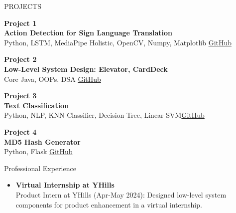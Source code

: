 \documentclass{resume} %
\begin{document}
\begin{rSection}{PROJECTS}
\vspace{-1.25em}
\item \textbf{Project 1} \\
\textbf{Action Detection for Sign Language Translation}\\
{Python, LSTM, MediaPipe Holistic, OpenCV, Numpy, Matplotlib} \hfill 
\href{https://github.com/yadavankit671/Action-Detection-For-Sign-Language-Translation}{GitHub}
\item \textbf{Project 2} \\
\textbf{Low-Level System Design: Elevator, CardDeck}\\
{Core Java, OOPs, DSA} \hfill \href{https://github.com/yadavankit671/Elevator-Design}{GitHub}
\item \textbf{Project 3} \\
\textbf{Text Classification}\\
{Python, NLP, KNN Classifier, Decision Tree, Linear SVM}\hfill \href{https://github.com/yadavankit671/Text-Categorization/}{GitHub}

\item \textbf{Project 4} \\
\textbf{MD5 Hash Generator}\\
{Python, Flask} \hfill \href{https://github.com/yadavankit671/MD5-Hash-Project-TTL}{GitHub}

\end{rSection} 
\begin{rSection}{Professional Experience} 
\begin{itemize}
    \item 	\textbf{Virtual Internship at YHills} \\
        Product Intern at YHills (Apr-May 2024): Designed low-level system components for product enhancement in a virtual internship.
\end{itemize}
\end{rSection}
\end{document}
